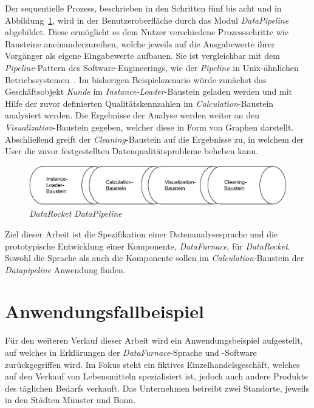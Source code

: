 \documentclass[
  language=german, %
  type=bachelor,%
  ngerman
]{isthesis}
\begin{document}
\begin{content}
	Der sequentielle Prozess, beschrieben in den Schritten fünf bis acht und in Abbildung~\ref{fig:datapipeline}, wird in
	der Benutzeroberfläche durch das Modul \textit{DataPipeline} abgebildet.
	Diese ermöglicht es dem Nutzer verschiedene Prozessschritte wie Bausteine
	aneinanderzureihen, welche jeweils auf die Ausgabewerte ihrer Vorgänger als
	eigene Eingabewerte aufbauen. Sie ist vergleichbar mit dem
	\textit{Pipeline}-Pattern des Software-Engineerings, wie \zB{} der
	\textit{Pipeline} in Unix-ähnlichen
	Betriebssystemen~\cite[][]{spinellis2001notable}. Im bisherigen
	Beispielszenario würde zunächst das Geschäftsobjekt \textit{Kunde} im
	\textit{Instance-Loader}-Baustein geladen werden und mit Hilfe der zuvor
	definierten Qualitätskennzahlen im \textit{Calculation}-Baustein analysiert
	werden. Die Ergebnisse der Analyse werden weiter an den
	\textit{Visualization}-Baustein gegeben, welcher diese in Form von Graphen
	darstellt. Abschließend greift der \textit{Cleaning}-Baustein auf die
	Ergebnisse zu, in welchem der User die zuvor festgestellten
	Datenqualitätsprobleme beheben kann.

  \begin{figure}
    \includegraphics[scale=0.9]{content/figures/datapipeline}
    \caption{\textit{DataRocket} \textit{DataPipeline}}\label{fig:datapipeline}
  \end{figure}


	Ziel dieser Arbeit ist die Spezifikation einer Datenanalysesprache und die
	prototypische Entwicklung einer Komponente, \textit{DataFurnace}, für
	\textit{DataRocket}. Sowohl die Sprache als auch die Komponente sollen im
	\textit{Calculation}-Baustein der \textit{Datapipeline} Anwendung finden.

  \section{Anwendungsfallbeispiel}\label{sec:anwendungsfallbeispiel}

  Für den weiteren Verlauf dieser Arbeit wird ein Anwendungsbeispiel
  aufgestellt, auf welches in Erklärungen der \textit{DataFurnace}-Sprache und
  -Software zurückgegriffen wird. Im Fokus steht ein fiktives
  Einzelhandelsgeschäft, welches auf den Verkauf von Lebensmitteln
  spezialisiert ist, jedoch auch andere Produkte des täglichen Bedarfs
  verkauft. Das Unternehmen betreibt zwei Standorte, jeweils in den Städten
  Münster und Bonn.


\end{content}
\end{document}
